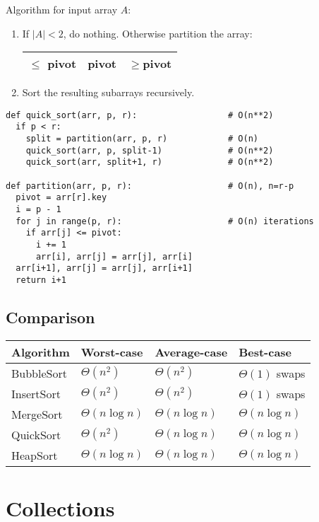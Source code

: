 \documentclass{article}
\begin{document}
Algorithm for input array $A$:
\begin{enumerate}
	\item If $|A|<2$, do nothing. Otherwise partition the array:
	\begin{tabular}{|c|c|c|}
		\hline
		$\leq$ pivot & pivot & $\geq$pivot\\
		\hline
	\end{tabular}
	\item Sort the resulting subarrays recursively.
\end{enumerate}

\begin{verbatim}
def quick_sort(arr, p, r):                  # O(n**2)
  if p < r:
    split = partition(arr, p, r)            # O(n)
    quick_sort(arr, p, split-1)             # O(n**2)
    quick_sort(arr, split+1, r)             # O(n**2)

def partition(arr, p, r):                   # O(n), n=r-p
  pivot = arr[r].key
  i = p - 1
  for j in range(p, r):                     # O(n) iterations
    if arr[j] <= pivot:
      i += 1
      arr[i], arr[j] = arr[j], arr[i]
  arr[i+1], arr[j] = arr[j], arr[i+1]
  return i+1
\end{verbatim}

\subsection{Comparison}

\begin{center}
	\begin{tabular}{l | l | l | l}
		\textbf{Algorithm} & \textbf{Worst-case} & \textbf{Average-case} & \textbf{Best-case}
		\\\hline
		BubbleSort & $\Theta(n^2)$     & $\Theta(n^2)$     & $\Theta(1)$ swaps
		\\\hline
		InsertSort & $\Theta(n^2)$     & $\Theta(n^2)$     & $\Theta(1)$ swaps
		\\\hline
		MergeSort  & $\Theta(n\log n)$ & $\Theta(n\log n)$ & $\Theta(n\log n)$
		\\\hline
		QuickSort  & $\Theta(n^2)$     & $\Theta(n\log n)$ & $\Theta(n\log n)$
		\\\hline
		HeapSort   & $\Theta(n\log n)$ & $\Theta(n\log n)$ & $\Theta(n\log n)$
	\end{tabular}
\end{center}

\section{Collections}
\end{document}
